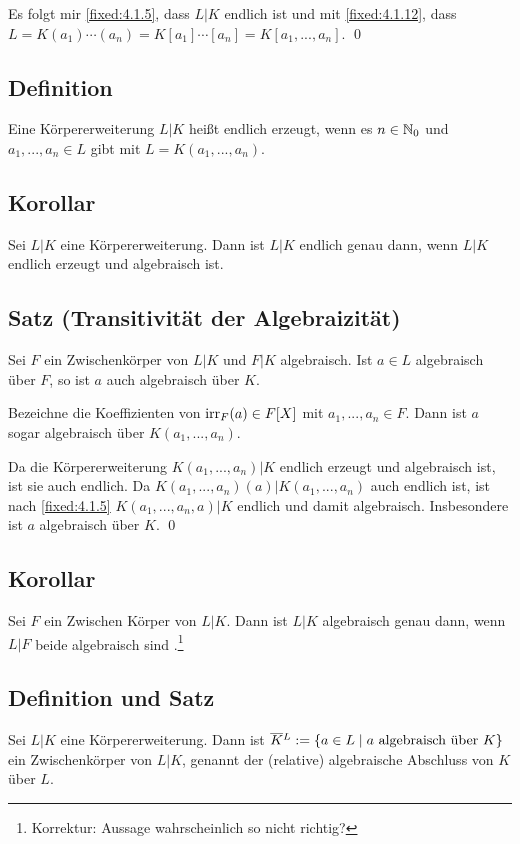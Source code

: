 Es folgt mir \ref{fixed:4.1.5}, dass $L|K$ endlich ist und mit \ref{fixed:4.1.12}, dass $L = K(a_1) \cdots (a_n) = K[a_1] \cdots [a_n] = K[a_1,...,a_n]$. \qed

\subsection{Definition} Eine Körpererweiterung $L|K$ heißt endlich erzeugt, wenn es $n \in \mathbb N_0$ und $a_1,...,a_n \in L$ gibt mit $L = K(a_1,...,a_n)$.

\subsection{Korollar} Sei $L|K$ eine Körpererweiterung. Dann ist $L|K$ endlich genau dann, wenn $L|K$ endlich erzeugt und algebraisch ist.

\subsection{Satz (Transitivität der Algebraizität)} Sei $F$ ein Zwischenkörper von $L|K$ und $F|K$ algebraisch. Ist $a \in L$ algebraisch über $F$, so ist $a$ auch algebraisch über $K$.

\proof Bezeichne die Koeffizienten von $\operatorname{irr}_F(a) \in F[X]$ mit $a_1,...,a_n \in F$. Dann ist $a$ sogar algebraisch über $K(a_1,...,a_n)$.

Da die Körpererweiterung $K(a_1,...,a_n)|K$ endlich erzeugt und algebraisch ist, ist sie auch endlich. Da $K(a_1,...,a_n)(a) | K(a_1,...,a_n)$ auch endlich ist, ist nach \ref{fixed:4.1.5} $K(a_1,...,a_n,a) | K$ endlich und damit algebraisch. Insbesondere ist $a$ algebraisch über $K$. \qed

\subsection{Korollar} Sei $F$ ein Zwischen Körper von $L|K$. Dann ist $L|K$ algebraisch genau dann, wenn $L|F$  beide algebraisch sind .\footnote{Korrektur: Aussage wahrscheinlich so nicht richtig?}

\subsection{Definition und Satz} Sei $L|K$ eine Körpererweiterung. Dann ist $\barsmash KL := \{a \in L \mid a \text{ algebraisch über } K\}$ ein Zwischenkörper von $L|K$, genannt der (relative) algebraische Abschluss von $K$ über $L$.

